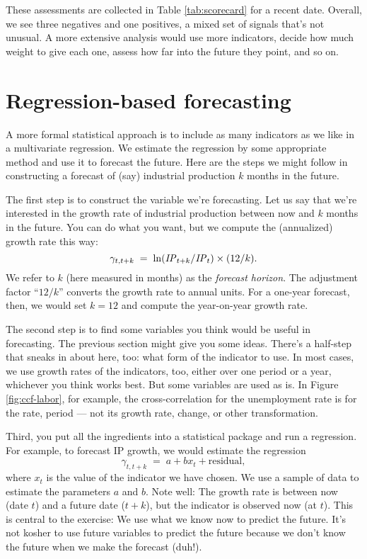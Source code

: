 These assessments are collected in Table \ref{tab:scorecard}
for a recent date.
Overall, we see three negatives and one positives,
a mixed set of signals that's not unusual.
A more extensive analysis would use more indicators,
decide how much weight to give each one,
assess how far into the future they point, and so on.


\section{Regression-based forecasting}

A more formal statistical approach is to include
as many indicators as we like in a multivariate regression.
We estimate the regression by some appropriate method
and use it to forecast the future.
Here are the steps we might follow in constructing a forecast
of (say) industrial production $k$ months in the future.

The first step is to construct the variable we're forecasting.
Let us say that we're interested in the growth rate of industrial
production between now and $k$ months in the future.
You can do what you want, but we compute the (annualized) growth
rate this way:
\[
    \gamma_{t,t+k} \;=\; \ln (\mbox{\em IP\/}_{t+k}/\mbox{\em IP\/}_t) \times (12/k) .
\]
We refer to $k$ (here measured in months) as the {\it forecast
horizon\/}.  The adjustment factor ``$12/k$'' converts the growth
rate to annual units.
For a one-year forecast, then, we would set $k=12$ and compute the
year-on-year growth rate.

The second step is to find some variables you think would be useful
in forecasting.
The previous section might give you some ideas.
There's a half-step that sneaks in about here, too:
what form of the indicator to use.
In most cases, we use growth rates of the indicators, too,
either over one period or a year,
whichever you think works best.
But some variables are used as is.
In Figure \ref{fig:ccf-labor}, for example,
the cross-correlation for the unemployment rate is for the rate, period --- not its growth rate, change, or other transformation.

Third, you put all the ingredients into a statistical package and run a regression.
For example, to forecast IP growth, we would estimate the regression
\[
        \gamma_{t,t+k}  \;=\;  a + b x_t + \mbox{residual},
\]
where $x_t$ is the value of the indicator we have chosen.
We use a sample of data to estimate the parameters $a$ and $b$.
Note well:  The growth rate is between now (date $t$)
and a future date ($t+k$),
but the indicator is observed now (at $t$).
This is central to the exercise:  We use what we know now
to predict the future.
It's not kosher to use future variables to predict the future
because we don't know the future when we make the forecast
(duh!).


